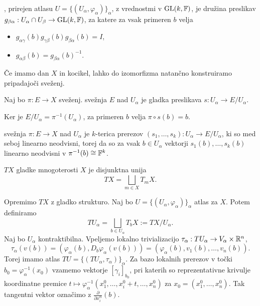 \begin{definicija}
  , prirejen atlasu $U = \{(U_\alpha, \varphi_\alpha)\}_\alpha$,
  z vrednostmi v $\operatorname{GL}(k, \mathbb{F})$, je družina preslikav $g_{\beta \alpha}: U_\alpha
  \cap U_\beta \to \operatorname{GL}(k, \mathbb{F})$, za katere za vsak primeren $b$ velja
  \begin{itemize}
  \item $g_{\alpha \gamma}(b) g_{\gamma \beta}(b) g_{\beta \alpha}(b) = I$,
  \item $g_{\alpha \beta}(b) = g_{\beta \alpha}(b)^{-1}$.
  \end{itemize}
\end{definicija}

\begin{opomba}
  Če imamo dan $X$ in kocikel, lahko do izomorfizma natančno konstruiramo
  pripadajoči sveženj.
\end{opomba}

\begin{definicija}
  Naj bo $\pi: E \to X$ sveženj.
   svežnja $E$ nad $U_\alpha$ je gladka preslikava
  $s: U_\alpha \to E/U_\alpha$.
\end{definicija}

\begin{opomba}
  Ker je $E/U_\alpha = \pi^{-1}(U_\alpha)$, za primeren $b$ velja $\pi \circ s(b) = b$.
\end{opomba}

\begin{definicija}
   svežnja $\pi: E \to X$ nad $U_\alpha$ je $k$-terica
  prerezov $(s_1, \ldots, s_k): U_\alpha \to E/U_\alpha$, ki so med seboj
  linearno neodvisni, torej da so za vsak $b \in U_\alpha$ vektorji $s_1(b),
  \ldots, s_k(b)$ linearno neodvisni v $\pi^{-1}(b) \cong \mathbb{F}^k$.
\end{definicija}

\begin{definicija}
   $TX$ gladke mnogoterosti $X$ je disjunktna unija
  \[
	TX = \bigsqcup_{m \in X} T_m X.
  \]
\end{definicija}

Opremimo $TX$ z gladko strukturo.
Naj bo $U = \{ (U_\alpha, \varphi_\alpha) \}_\alpha$ atlas za $X$.
Potem definiramo
\[
  T U_\alpha = \bigsqcup_{b \in U_\alpha} T_b X := TX / U_\alpha.
\]
Naj bo $U_\alpha$ kontraktibilna.
Vpeljemo lokalno trivializacijo $\tau_\alpha: TU_\alpha \to V_\alpha \times
\mathbb{R}^n$,
\[
  \tau_\alpha(v(b)) = (\varphi_\alpha(b), D_b \varphi_\alpha (v(b)))
  = (\varphi_\alpha(b), v_1(b), \ldots, v_n(b)).
\]
Torej imamo atlas $TU = \{ (TU_\alpha, \tau_\alpha) \}_\alpha$.
Za bazo lokalnih prerezov v točki $b_0 = \varphi_\alpha^{-1}(x_0)$ vzamemo
vektorje $[\gamma_i]_{b_0}$, pri katerih so reprezentativne krivulje koordinatne
premice $t \mapsto \varphi_\alpha^{-1}(x_1^0, \ldots, x_i^0  + t, \ldots,
x_n^0)$ za $x_0 = (x_1^0, \ldots, x_n^0)$.
Tak tangentni vektor označimo z $\frac{\partial}{\partial x_i^\alpha}(b)$.

